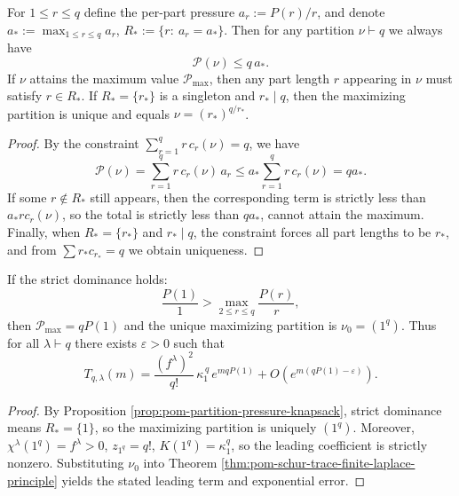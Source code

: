 \begin{proposition}\label{prop:pom-partition-pressure-knapsack}
For \(1\le r\le q\) define the per-part pressure \(a_r:=P(r)/r\), and denote \(a_*:=\max_{1\le r\le q}a_r\), \(R_*:=\{r:\ a_r=a_*\}\).
Then for any partition \(\nu\vdash q\) we always have
\[
\mathcal{P}(\nu)\le q\,a_*.
\]
If \(\nu\) attains the maximum value \(\mathcal{P}_{\max}\), then any part length \(r\) appearing in \(\nu\) must satisfy \(r\in R_*\).
If \(R_*=\{r_*\}\) is a singleton and \(r_*\mid q\), then the maximizing partition is unique and equals \(\nu=(r_*)^{q/r_*}\).
\end{proposition}
\begin{proof}
By the constraint \(\sum_{r=1}^{q} r\,c_r(\nu)=q\), we have
\[
\mathcal{P}(\nu)=\sum_{r=1}^{q} r\,c_r(\nu)\,a_r\le a_*\sum_{r=1}^{q} r\,c_r(\nu)=q a_*.
\]
If some \(r\notin R_*\) still appears, then the corresponding term is strictly less than \(a_* r c_r(\nu)\), so the total is strictly less than \(q a_*\), cannot attain the maximum.
Finally, when \(R_*=\{r_*\}\) and \(r_*\mid q\), the constraint forces all part lengths to be \(r_*\), and from \(\sum r_*c_{r_*}=q\) we obtain uniqueness.
\end{proof}

\begin{corollary}\label{cor:pom-identity-sector-collapse-all-schur-channels}
If the strict dominance holds:
\[
\frac{P(1)}{1}>\max_{2\le r\le q}\frac{P(r)}{r},
\]
then \(\mathcal{P}_{\max}=qP(1)\) and the unique maximizing partition is \(\nu_0=(1^q)\).
Thus for all \(\lambda\vdash q\) there exists \(\varepsilon>0\) such that
\[
T_{q,\lambda}(m)
=
\frac{(f^\lambda)^2}{q!}\,\kappa_1^{\,q}\,e^{m qP(1)}
+O\!\left(e^{m(qP(1)-\varepsilon)}\right).
\]
\end{corollary}
\begin{proof}
By Proposition \ref{prop:pom-partition-pressure-knapsack}, strict dominance means \(R_*=\{1\}\), so the maximizing partition is uniquely \((1^q)\).
Moreover, \(\chi^\lambda(1^q)=f^\lambda>0\), \(z_{1^q}=q!\), \(K(1^q)=\kappa_1^q\), so the leading coefficient is strictly nonzero.
Substituting \(\nu_0\) into Theorem \ref{thm:pom-schur-trace-finite-laplace-principle} yields the stated leading term and exponential error.
\end{proof}

